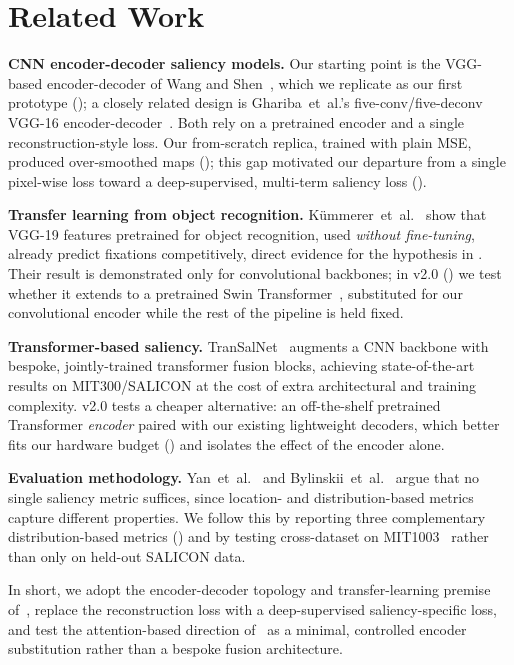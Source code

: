 
\section{Related Work}
\label{sec:related_work}

\textbf{CNN encoder-decoder saliency models.} Our starting point is the VGG-based encoder-decoder of Wang and Shen~\cite{wang2018deep}, which we replicate as our first prototype (); a closely related design is Ghariba~et~al.'s five-conv/five-deconv VGG-16 encoder-decoder~\cite{ghariba2019visual}. Both rely on a pretrained encoder and a single reconstruction-style loss. Our from-scratch replica, trained with plain MSE, produced over-smoothed maps (); this gap motivated our departure from a single pixel-wise loss toward a deep-supervised, multi-term saliency loss ().

\textbf{Transfer learning from object recognition.} K\"ummerer~et~al.~\cite{kummerer2016deepgaze} show that VGG-19 features pretrained for object recognition, used \textit{without fine-tuning}, already predict fixations competitively, direct evidence for the hypothesis in . Their result is demonstrated only for convolutional backbones; in v2.0 () we test whether it extends to a pretrained Swin Transformer~\cite{liu2021swin}, substituted for our convolutional encoder while the rest of the pipeline is held fixed.

\textbf{Transformer-based saliency.} TranSalNet~\cite{lou2022transalnet} augments a CNN backbone with bespoke, jointly-trained transformer fusion blocks, achieving state-of-the-art results on MIT300/SALICON at the cost of extra architectural and training complexity. v2.0 tests a cheaper alternative: an off-the-shelf pretrained Transformer \textit{encoder} paired with our existing lightweight decoders, which better fits our hardware budget () and isolates the effect of the encoder alone.

\textbf{Evaluation methodology.} Yan~et~al.~\cite{yan2022review} and Bylinskii~et~al.~\cite{bylinskii2019different} argue that no single saliency metric suffices, since location- and distribution-based metrics capture different properties. We follow this by reporting three complementary distribution-based metrics () and by testing cross-dataset on MIT1003~\cite{judd2009learning} rather than only on held-out SALICON data.

In short, we adopt the encoder-decoder topology and transfer-learning premise of~\cite{wang2018deep,ghariba2019visual,kummerer2016deepgaze}, replace the reconstruction loss with a deep-supervised saliency-specific loss, and test the attention-based direction of~\cite{lou2022transalnet} as a minimal, controlled encoder substitution rather than a bespoke fusion architecture.
